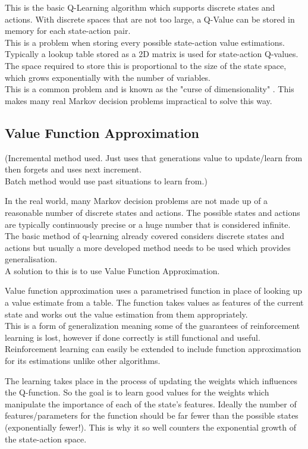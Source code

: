 \documentclass{report}
\begin{document}
This is the basic Q-Learning algorithm which supports discrete states and actions. With discrete spaces that are not too large, a Q-Value can be stored in memory for
each state-action pair.\\
This is a problem when storing every possible state-action value estimations. Typically a lookup table stored as a 2D matrix is used for state-action Q-values. The space
required to store this is proportional to the size of the state space, which grows exponentially with the number of variables.\\
This is a common problem and is known as the "curse of dimensionality" \citep{bellman2013dynamic}. This makes many real Markov decision problems 
impractical to solve this way.

\subsection{Value Function Approximation}

(Incremental method used. Just uses that generations value to update/learn from then forgets and uses next increment.\\
Batch method would use past situations to learn from.)

In the real world, many  Markov decision problems are not made up of a reasonable number of discrete states and actions. The possible states and actions are typically 
continuously precise or a huge number that is considered infinite.\\ The basic method of q-learning already covered considers discrete states and actions but usually a
 more developed method needs to be used which provides generalisation.\\
A solution to this is to use Value Function Approximation.

Value function approximation uses a parametrised function in place of looking up a value estimate from a table. The function takes values as features of the 
current state and works out the value estimation from them appropriately.\\
This is a form of generalization meaning some of the guarantees of reinforcement learning is lost, however if done correctly is still functional and useful.
Reinforcement learning can easily be extended to include function approximation for its estimations unlike other algorithms.

The learning takes place in the process of updating the weights which influences the Q-function. So the goal is to learn good values for the weights which manipulate the importance of each of the state's features.
Ideally the number of features/parameters for the function should be far fewer than the possible states (exponentially fewer!). This is why it so well counters the exponential growth of the state-action space.
\end{document}
